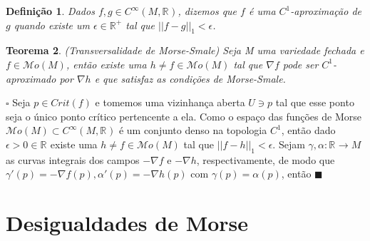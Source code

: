 \documentclass[12pt]{book}
\newtheorem{teorema}{Teorema}[section]
\newtheorem{definicao}[teorema]{Definição}
\newenvironment{prova}[1]{$\square$ #1}{\hfill$\blacksquare$}
\newcommand{\funcoessuaves}[1]{C^{\infty}(#1, \real{})}
\newcommand{\pontocritico}[1]{\textit{Crit}(#1)}
\newcommand{\real}[1]{\mathbb{R}^{#1}}
\newcommand{\morsefunc}[1]{\mathcal{M}o(#1)}
\begin{document}
	\begin{definicao}
		Dados $f, g \in \funcoessuaves{M}$, dizemos que $f$ é uma $C^{1}$-aproximação de $g$ quando existe um $\epsilon \in \real{+}$ tal que $||f-g||_{1} < \epsilon$.
	\end{definicao}
	
	\begin{teorema}
		(Transversalidade de Morse-Smale) Seja M uma variedade fechada e $f \in \morsefunc{M}$, então existe uma $h \neq f \in \morsefunc{M}$ tal que $\nabla f$ pode ser $C^{1}$-aproximado por $\nabla h$ e que satisfaz as condições de Morse-Smale.
	\end{teorema}
	\begin{prova}
		Seja $p \in \pontocritico{f}$ e tomemos uma vizinhança aberta $U \ni p$ tal que esse ponto seja o único ponto crítico pertencente a ela. Como o espaço das funções de Morse $\morsefunc{M} \subset C^{\infty}(M, \real{})$ é um conjunto denso na topologia $C^{1}$, então dado $\epsilon > 0 \in \real{}$ existe uma $h \neq f \in \morsefunc{M}$ tal que $||f-h||_{1} < \epsilon$. Sejam $\gamma, \alpha : \real{} \to M$ as curvas integrais dos campos $-\nabla f$ e $-\nabla h$, respectivamente, de modo que $\gamma'(p) = -\nabla f(p), \alpha'(p) = -\nabla h(p)$ com $\gamma(p) = \alpha(p)$, então
	\end{prova}

	\section{Desigualdades de Morse}
	
\end{document}
